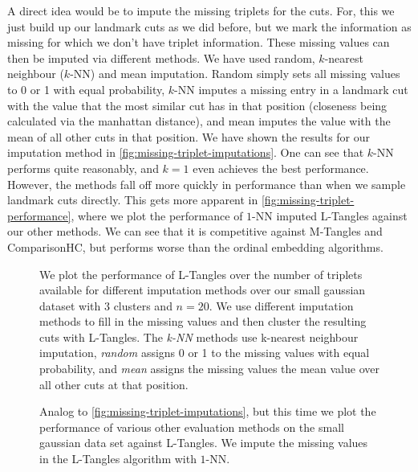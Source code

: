 A direct idea would be to impute the missing triplets for the cuts.  For, this we just build up our landmark cuts as we did before,
but we mark the information as missing for which we don't have triplet information. These missing values can then be imputed via different methods.
We have used random, $k$-nearest neighbour ($k$-NN) and mean imputation. Random simply sets all missing values to 0 or 1 with equal probability, $k$-NN imputes
a missing entry in a landmark cut with the value that the most similar cut has in that position (closeness being calculated via the manhattan distance), and mean 
imputes the value with the mean of all other cuts in that position. 
We have shown the results for our imputation method in \autoref{fig:missing-triplet-imputations}.  One can see that $k$-NN performs quite reasonably, and $k=1$ even achieves the best performance.
However, the methods fall off more quickly in performance than when we sample landmark cuts directly. This gets more apparent in \autoref{fig:missing-triplet-performance}, where we plot
the performance of $1$-NN imputed L-Tangles against our other methods. We can see that it is competitive against M-Tangles and ComparisonHC, but performs worse than the ordinal embedding algorithms.

\begin{figure}[ht]
    \centering
    \resizebox{0.7\textwidth}{!}{}
    \caption{
        We plot the performance of L-Tangles over the number of triplets available for different imputation methods over our small gaussian dataset with $3$ clusters
        and $n=20$. We use different imputation methods to fill in the missing values and then cluster the resulting cuts with L-Tangles.
        The \textit{k-NN} methods use k-nearest neighbour imputation, \textit{random} assigns 0 or 1 to the missing values with equal probability, and \textit{mean} assigns the missing
        values the mean value over all other cuts at that position.
    }
    \label{fig:missing-triplet-imputations}
\end{figure}

\begin{figure}[ht]
    \centering
    \resizebox{0.7\textwidth}{!}{}
    \caption{
        Analog to \autoref{fig:missing-triplet-imputations}, but this time we plot the performance of various other evaluation methods on the small gaussian data set against L-Tangles.
        We impute the missing values in the L-Tangles algorithm with $1$-NN.
    }
    \label{fig:missing-triplet-performance}
\end{figure}


